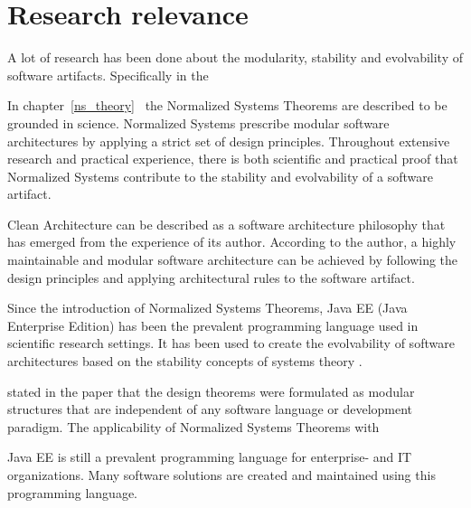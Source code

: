 \section{Research relevance} \label{sec:research_relevance} 


A lot of research has been done about the modularity, stability and evolvability of
software artifacts. Specifically in the 

In chapter~\ref{ns_theory}~ the Normalized Systems Theorems are
described to be grounded in science. Normalized Systems prescribe modular software
architectures by applying a strict set of design principles. Throughout extensive research
and practical experience, there is both scientific and practical proof that Normalized
Systems contribute to the stability and evolvability of a software artifact.

Clean Architecture can be described as a software architecture philosophy that has emerged
from the experience of its author. According to the author, a highly maintainable and
modular software architecture can be achieved by following the design principles and
applying architectural rules to the software artifact.

Since the introduction of Normalized Systems Theorems, Java EE (Java Enterprise Edition)
has been the prevalent programming language used in scientific research settings. It has
been used to create the evolvability of software architectures based on the stability
concepts of systems theory \parencite[]{mannaert_towards_2012}.

\citeauthor{mannaert_towards_2012} stated in the paper that the design theorems were
formulated as modular structures that are independent of any software language or
development paradigm. The applicability of Normalized Systems Theorems with

Java EE is still a prevalent programming language for enterprise- and IT organizations.
Many software solutions are created and maintained using this programming language.